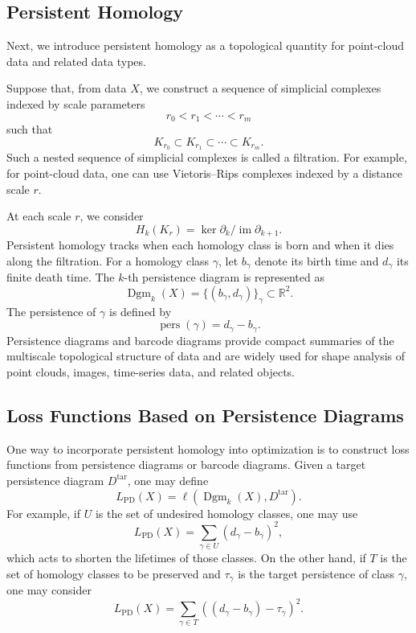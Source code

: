 \documentclass[pdflatex,sn-mathphys-num]{sn-jnl}%
\theoremstyle{thmstyleone}%
\theoremstyle{thmstyletwo}%
\theoremstyle{thmstylethree}%
\begin{document}
\subsection{Persistent Homology}

Next, we introduce persistent homology
\cite{edelsbrunner2002topological,zomorodian2004computing,cohen2005stability,edelsbrunner2008persistent,otter2017roadmap}
as a topological quantity for point-cloud data and related data types.

Suppose that, from data \(X\), we construct a sequence of simplicial complexes indexed by scale parameters
\[
r_0<r_1<\cdots<r_m
\]
such that
\[
K_{r_0}
\subset
K_{r_1}
\subset
\cdots
\subset
K_{r_m}.
\]
Such a nested sequence of simplicial complexes is called a filtration.
For example, for point-cloud data, one can use Vietoris--Rips complexes indexed by a distance scale \(r\).

At each scale \(r\), we consider
\[
H_k(K_r)
=
\ker\partial_k/\operatorname{im}\partial_{k+1}.
\]
Persistent homology tracks when each homology class is born and when it dies along the filtration.
For a homology class \(\gamma\), let \(b_\gamma\) denote its birth time and \(d_\gamma\) its finite death time.
The \(k\)-th persistence diagram is represented as
\[
\operatorname{Dgm}_k(X)
=
\{(b_\gamma,d_\gamma)\}_{\gamma}
\subset\mathbb{R}^2.
\]
The persistence of \(\gamma\) is defined by
\[
\operatorname{pers}(\gamma)
=
d_\gamma-b_\gamma.
\]
Persistence diagrams and barcode diagrams provide compact summaries of the multiscale topological structure of data and are widely used for shape analysis of point clouds, images, time-series data, and related objects.

\subsection{Loss Functions Based on Persistence Diagrams}

One way to incorporate persistent homology into optimization is to construct loss functions from persistence diagrams or barcode diagrams.
Given a target persistence diagram \(D^{\mathrm{tar}}\), one may define
\[
L_{\mathrm{PD}}(X)
=
\ell
\left(
\operatorname{Dgm}_k(X),
D^{\mathrm{tar}}
\right).
\]
For example, if \(U\) is the set of undesired homology classes, one may use
\[
L_{\mathrm{PD}}(X)
=
\sum_{\gamma\in U}
(d_\gamma-b_\gamma)^2,
\]
which acts to shorten the lifetimes of those classes.
On the other hand, if \(T\) is the set of homology classes to be preserved and \(\tau_\gamma\) is the target persistence of class \(\gamma\), one may consider
\[
L_{\mathrm{PD}}(X)
=
\sum_{\gamma\in T}
\left(
(d_\gamma-b_\gamma)-\tau_\gamma
\right)^2.
\]
\end{document}
